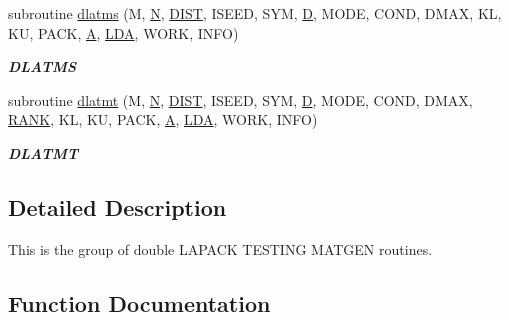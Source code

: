 \begin{DoxyCompactItemize}
subroutine \hyperlink{group__double__matgen_gadf4ba9c37cb5f67132e71433efa825d4}{dlatms} (M, \hyperlink{polmisc_8c_a0240ac851181b84ac374872dc5434ee4}{N}, \hyperlink{superlu__enum__consts_8h_af00a42ecad444bbda75cde1b64bd7e72ac04fbbdf0d80a4ad25e565541deeebd7}{D\+I\+S\+T}, I\+S\+E\+E\+D, S\+Y\+M, \hyperlink{odrpack_8h_a7dae6ea403d00f3687f24a874e67d139}{D}, M\+O\+D\+E, C\+O\+N\+D, D\+M\+A\+X, K\+L, K\+U, P\+A\+C\+K, \hyperlink{classA}{A}, \hyperlink{example__user_8c_ae946da542ce0db94dced19b2ecefd1aa}{L\+D\+A}, W\+O\+R\+K, I\+N\+F\+O)
\begin{DoxyCompactList}\small\item\em {\bfseries D\+L\+A\+T\+M\+S} \end{DoxyCompactList}\item 
subroutine \hyperlink{group__double__matgen_gabf8567d631c6df83a8e336aec741bc77}{dlatmt} (M, \hyperlink{polmisc_8c_a0240ac851181b84ac374872dc5434ee4}{N}, \hyperlink{superlu__enum__consts_8h_af00a42ecad444bbda75cde1b64bd7e72ac04fbbdf0d80a4ad25e565541deeebd7}{D\+I\+S\+T}, I\+S\+E\+E\+D, S\+Y\+M, \hyperlink{odrpack_8h_a7dae6ea403d00f3687f24a874e67d139}{D}, M\+O\+D\+E, C\+O\+N\+D, D\+M\+A\+X, \hyperlink{splinemodule_8c_a3a88bcc63386de30443dacede2e01847}{R\+A\+N\+K}, K\+L, K\+U, P\+A\+C\+K, \hyperlink{classA}{A}, \hyperlink{example__user_8c_ae946da542ce0db94dced19b2ecefd1aa}{L\+D\+A}, W\+O\+R\+K, I\+N\+F\+O)
\begin{DoxyCompactList}\small\item\em {\bfseries D\+L\+A\+T\+M\+T} \end{DoxyCompactList}\end{DoxyCompactItemize}


\subsection{Detailed Description}
This is the group of double L\+A\+P\+A\+C\+K T\+E\+S\+T\+I\+N\+G M\+A\+T\+G\+E\+N routines. 

\subsection{Function Documentation}
\hypertarget{group__double__matgen_ga304ff4a7c0dde761985bac5659ea48eb}{}
